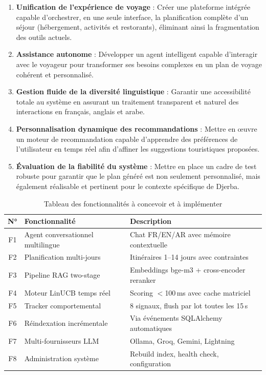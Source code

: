 \begin{enumerate}
    \item \textbf{Unification de l'expérience de voyage} : Créer une plateforme intégrée capable d'orchestrer, en une seule interface, la planification complète d'un séjour (hébergement, activités et restorants), éliminant ainsi la fragmentation des outils actuels.
    
    \item \textbf{Assistance autonome} : Développer un agent intelligent capable d'interagir avec le voyageur pour transformer ses besoins complexes en un plan de voyage cohérent et personnalisé.
    
    \item \textbf{Gestion fluide de la diversité linguistique} : Garantir une accessibilité totale au système en assurant un traitement transparent et naturel des interactions en français, anglais et arabe.
    
    \item \textbf{Personnalisation dynamique des recommandations} : Mettre en œuvre un moteur de recommandation capable d'apprendre des préférences de l'utilisateur en temps réel afin d'affiner les suggestions touristiques proposées.
    
    \item \textbf{Évaluation de la fiabilité du système} : Mettre en place un cadre de test robuste pour garantir que le plan généré est non seulement personnalisé, mais également réalisable et pertinent pour le contexte spécifique de Djerba.
\end{enumerate}

\begin{table}[H]
    \centering
    \caption{Tableau des fonctionnalités à concevoir et à implémenter}
    \label{tab:fonctionnalites}
    \small
    \begin{tabular}{c p{5cm} p{6.5cm}}
        \toprule
        \textbf{N°} & \textbf{Fonctionnalité} & \textbf{Description} \\
        \midrule
        F1 & Agent conversationnel multilingue & Chat FR/EN/AR avec mémoire contextuelle \\[3pt]
        F2 & Planification multi-jours & Itinéraires 1--14 jours avec contraintes \\[3pt]
        F3 & Pipeline RAG two-stage & Embeddings bge-m3 + cross-encoder reranker \\[3pt]
        F4 & Moteur LinUCB temps réel & Scoring $<$100\,ms avec cache matriciel \\[3pt]
        F5 & Tracker comportemental & 8 signaux, flush par lot toutes les 15\,s \\[3pt]
        F6 & Réindexation incrémentale & Via événements SQLAlchemy automatiques \\[3pt]
        F7 & Multi-fournisseurs LLM & Ollama, Groq, Gemini, Lightning \\[3pt]
        F8 & Administration système & Rebuild index, health check, configuration \\
        \bottomrule
    \end{tabular}
\end{table}


